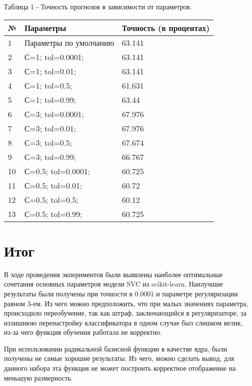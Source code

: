 \documentclass[a4paper,12pt]{article}
\begin{document}
	\vspace{0.5cm}
	Таблица 1 - Точность прогнозов в зависимости от параметров.
\begin{longtable}{|p{1cm}|p{9cm}|p{3cm}|}
\hline 
№ & Параметры & Точность (в процентах) \\ 
\hline 
1 & Параметры по умолчанию & 63.141 \\
\hline
2 & С=1; tol=0.0001; & 63.141 \\
\hline 
3 & С=1; tol=0.01; & 63.141 \\
\hline 
4 &  С=1; tol=0.5;  & 61.631 \\
\hline 
5 & С=1; tol=0.99;  & 63.44 \\
\hline
6 & С=3; tol=0.0001; & 67.976 \\
\hline 
7 & С=3; tol=0.01; & 67.976 \\
\hline 
8 &  С=3; tol=0.5;  & 67.674 \\
\hline 
9 & С=3; tol=0.99;  & 66.767 \\
\hline
10 & С=0.5; tol=0.0001; & 60.725 \\
\hline 
11 & С=0.5; tol=0.01; & 60.72 \\
\hline 
12 & С=0.5; tol=0.5;  & 60.12 \\
\hline 
13 & С=0.5; tol=0.99;  & 60.725 \\
\hline 
\end{longtable}


\newpage\section{Итог}
	В ходе проведения экпериментов были выявлены наиболее оптимальные сочетания основных параметров модели SVC из scikit-learn.  Наилучшие результаты были получены при точности в 0.0001 и параметре регуляризации равном 3-ем. Из чего можно предположить, что при малых значениях параметра, происходило переобучение, так как штраф, заключающийся в регуляризаторе, за излишнюю перенастройку классификатора в одном случае был слишком велик, из-за чего функция обучения работала не корректно.
	
	\vspace{0.5cm}
	При использовании радикальной базисной функции в качестве ядра, были получены не самые хорошие результаты. Из чего, можно сделать вывод, для данного набора эта функция не может построить корректное отображение на меньшую размерность. 
	
	
\end{document}
